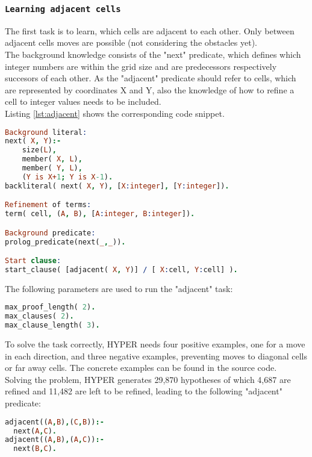 \subsubsection{\texttt{Learning adjacent cells}}
The first task is to learn, which cells are adjacent to each other. Only between adjacent cells moves are possible (not considering the obstacles yet).\\
The background knowledge consists of the "next" predicate, which defines which integer numbers are within the grid size and are predecessors respectively succesors of each other.
As the "adjacent" predicate should refer to cells, which are represented by coordinates X and Y, also the knowledge of how to refine a cell to integer values needs to be included.\\
Listing \ref{lst:adjacent} shows the corresponding code snippet.
\begin{lstlisting}[label={lst:adjacent}, language=Prolog, caption=Learning the predicate "adjacent", belowcaptionskip=1cm]
Background literal:
next( X, Y):- 
	size(L),
	member( X, L),
	member( Y, L),
	(Y is X+1; Y is X-1).
backliteral( next( X, Y), [X:integer], [Y:integer]).

Refinement of terms:
term( cell, (A, B), [A:integer, B:integer]).

Background predicate:
prolog_predicate(next(_,_)).

Start clause:
start_clause( [adjacent( X, Y)] / [ X:cell, Y:cell] ). 
\end{lstlisting}
The following parameters are used to run the "adjacent" task:
\begin{lstlisting}[label={lst:adjacent_params}, language=Prolog, caption=Parameters for learning "adjacent", belowcaptionskip=1cm]
max_proof_length( 2).   
max_clauses( 2).        
max_clause_length( 3).  
\end{lstlisting}
To solve the task correctly, HYPER needs four positive examples, one for a move in each direction, and three negative examples, preventing moves to diagonal cells or far away cells.
The concrete examples can be found in the source code.\\
Solving the problem, HYPER generates 29,870 hypotheses of which 4,687 are refined and 11,482 are left to be refined, leading to the following "adjacent" predicate:
\begin{lstlisting}[label={lst:adjacent_res}, language=Prolog, caption=Predicate "adjacent", belowcaptionskip=1cm]
adjacent((A,B),(C,B)):-
  next(A,C).
adjacent((A,B),(A,C)):-
  next(B,C).
\end{lstlisting}
